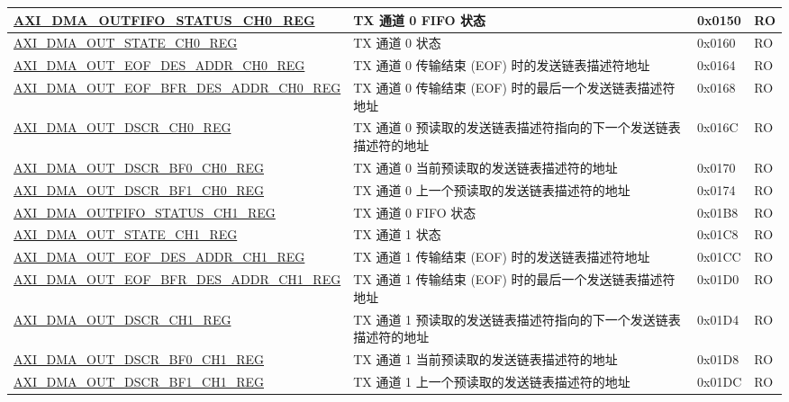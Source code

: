 \begin{longtable}{ | l | l | p{1.3cm} | l | }
\hyperref[regdesc:AXIDMAOUTFIFOSTATUSCHNREG]{AXI\_DMA\_OUTFIFO\_STATUS\_CH0\_REG} & TX 通道 0 FIFO 状态 & 0x0150 & RO \\ \hline
\hyperref[regdesc:AXIDMAOUTSTATECHNREG]{AXI\_DMA\_OUT\_STATE\_CH0\_REG} & TX 通道 0 状态 & 0x0160 & RO \\ \hline
\hyperref[regdesc:AXIDMAOUTEOFDESADDRCHNREG]{AXI\_DMA\_OUT\_EOF\_DES\_ADDR\_CH0\_REG} & TX 通道 0 传输结束 (EOF) 时的发送链表描述符地址 & 0x0164 & RO \\ \hline
\hyperref[regdesc:AXIDMAOUTEOFBFRDESADDRCHNREG]{AXI\_DMA\_OUT\_EOF\_BFR\_DES\_ADDR\_CH0\_REG} & TX 通道 0 传输结束 (EOF) 时的最后一个发送链表描述符地址 & 0x0168 & RO \\ \hline
\hyperref[regdesc:AXIDMAOUTDSCRCHNREG]{AXI\_DMA\_OUT\_DSCR\_CH0\_REG} & TX 通道 0 预读取的发送链表描述符指向的下一个发送链表描述符的地址 & 0x016C & RO \\ \hline
\hyperref[regdesc:AXIDMAOUTDSCRBF0CHNREG]{AXI\_DMA\_OUT\_DSCR\_BF0\_CH0\_REG} & TX 通道 0 当前预读取的发送链表描述符的地址 & 0x0170 & RO \\ \hline
\hyperref[regdesc:AXIDMAOUTDSCRBF1CHNREG]{AXI\_DMA\_OUT\_DSCR\_BF1\_CH0\_REG} & TX 通道 0 上一个预读取的发送链表描述符的地址 & 0x0174 & RO \\ \hline
\hyperref[regdesc:AXIDMAOUTFIFOSTATUSCHNREG]{AXI\_DMA\_OUTFIFO\_STATUS\_CH1\_REG} & TX 通道 0 FIFO 状态 & 0x01B8 & RO \\ \hline
\hyperref[regdesc:AXIDMAOUTSTATECHNREG]{AXI\_DMA\_OUT\_STATE\_CH1\_REG} & TX 通道 1 状态 & 0x01C8 & RO \\ \hline
\hyperref[regdesc:AXIDMAOUTEOFDESADDRCHNREG]{AXI\_DMA\_OUT\_EOF\_DES\_ADDR\_CH1\_REG} & TX 通道 1 传输结束 (EOF) 时的发送链表描述符地址 & 0x01CC & RO \\ \hline
\hyperref[regdesc:AXIDMAOUTEOFBFRDESADDRCHNREG]{AXI\_DMA\_OUT\_EOF\_BFR\_DES\_ADDR\_CH1\_REG} & TX 通道 1 传输结束 (EOF) 时的最后一个发送链表描述符地址 & 0x01D0 & RO \\ \hline
\hyperref[regdesc:AXIDMAOUTDSCRCHNREG]{AXI\_DMA\_OUT\_DSCR\_CH1\_REG} & TX 通道 1 预读取的发送链表描述符指向的下一个发送链表描述符的地址 & 0x01D4 & RO \\ \hline
\hyperref[regdesc:AXIDMAOUTDSCRBF0CHNREG]{AXI\_DMA\_OUT\_DSCR\_BF0\_CH1\_REG} & TX 通道 1 当前预读取的发送链表描述符的地址 & 0x01D8 & RO \\ \hline
\hyperref[regdesc:AXIDMAOUTDSCRBF1CHNREG]{AXI\_DMA\_OUT\_DSCR\_BF1\_CH1\_REG} & TX 通道 1 上一个预读取的发送链表描述符的地址 & 0x01DC & RO \\ \hline

\end{longtable}

